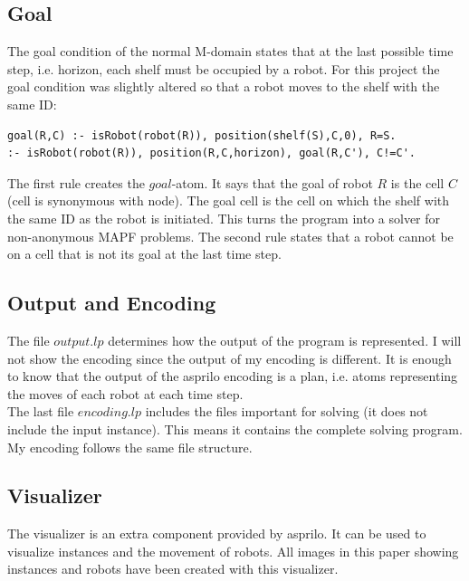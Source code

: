 \documentclass[runningheads]{llncs}
\begin{document}
\subsection{Goal}
The goal condition of the normal M-domain states that at the last possible time step, i.e. horizon, each shelf must be occupied by a robot. For this project the goal condition was slightly altered so that a robot moves to the shelf with the same ID:
\begin{verbatim}
goal(R,C) :- isRobot(robot(R)), position(shelf(S),C,0), R=S.
:- isRobot(robot(R)), position(R,C,horizon), goal(R,C'), C!=C'.
\end{verbatim}
The first rule creates the $goal$-atom. It says that the goal of robot $R$ is the cell $C$ (cell is synonymous with node). The goal cell is the cell on which the shelf with the same ID as the robot is initiated. This turns the program into a solver for non-anonymous MAPF problems. The second rule states that a robot cannot be on a cell that is not its goal at the last time step.
\subsection{Output and Encoding}
The file $output.lp$ determines how the output of the program is represented. I will not show the encoding since the output of my encoding is different. It is enough to know that the output of the asprilo encoding is a plan, i.e. atoms representing the moves of each robot at each time step. \\
The last file $encoding.lp$ includes the files important for solving (it does not include the input instance). This means it contains the complete solving program. My encoding follows the same file structure.
\subsection{Visualizer}
The visualizer is an extra component provided by asprilo. It can be used to visualize instances and the movement of robots. All images in this paper showing instances and robots have been created with this visualizer.
\end{document}
